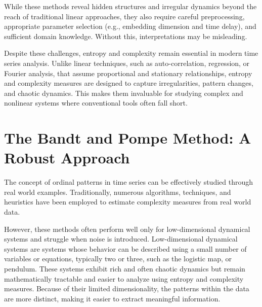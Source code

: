 
While these methods reveal hidden structures and irregular dynamics beyond the reach of traditional linear approaches, they also require careful preprocessing, appropriate parameter selection (e.g., embedding dimension and time delay), and sufficient domain knowledge. Without this, interpretations may be misleading.


Despite these challenges, entropy and complexity remain essential in modern time series analysis. Unlike linear techniques, such as auto-correlation, regression, or Fourier analysis, that assume proportional and stationary relationships, entropy and complexity measures are designed to capture irregularities, pattern changes, and chaotic dynamics. This makes them invaluable for studying complex and nonlinear systems where conventional tools often fall short.


\section{The Bandt and Pompe Method: A Robust Approach} \label{Sec:BP method}

The concept of ordinal patterns in time series can be effectively studied through real world examples. 
Traditionally, numerous algorithms, techniques, and heuristics have been employed to estimate complexity measures from real world data. 

However, these methods often perform well only for low-dimensional dynamical systems and struggle when noise is introduced. Low-dimensional dynamical systems are systems whose behavior can be described using a small number of variables or equations, typically two or three, such as the logistic map, or pendulum. These systems exhibit rich and often chaotic dynamics but remain mathematically tractable and easier to analyze using entropy and complexity measures. Because of their limited dimensionality, the patterns within the data are more distinct, making it easier to extract meaningful information. 

